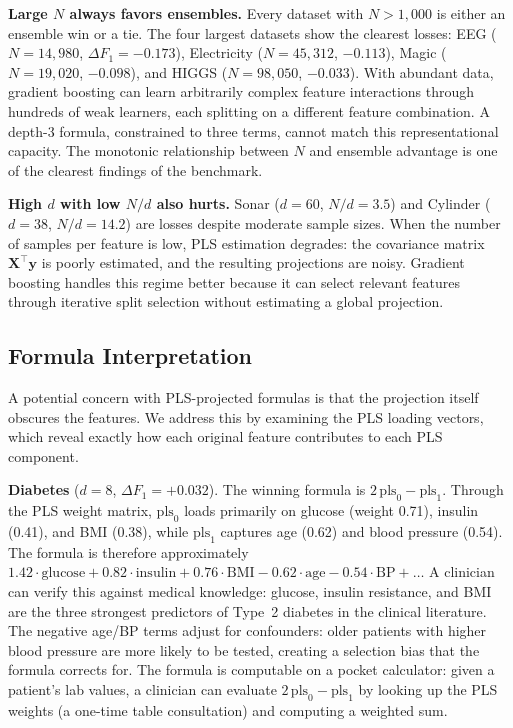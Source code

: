 \documentclass[journal]{IEEEtran}
\begin{document}
\textbf{Large $N$ always favors ensembles.}
Every dataset with $N > 1{,}000$ is either an ensemble win or a tie.
The four largest datasets show the clearest losses: EEG
($N = 14{,}980$, $\Delta F_1 = -0.173$), Electricity
($N = 45{,}312$, $-0.113$), Magic ($N = 19{,}020$, $-0.098$), and
HIGGS ($N = 98{,}050$, $-0.033$).  With abundant data, gradient
boosting can learn arbitrarily complex feature interactions through
hundreds of weak learners, each splitting on a different feature
combination.  A depth-3 formula, constrained to three terms, cannot
match this representational capacity.  The monotonic relationship
between $N$ and ensemble advantage is one of the clearest findings
of the benchmark.

\textbf{High $d$ with low $N/d$ also hurts.}
Sonar ($d = 60$, $N/d = 3.5$) and Cylinder ($d = 38$, $N/d = 14.2$)
are losses despite moderate sample sizes.  When the number of
samples per feature is low, PLS estimation degrades: the covariance
matrix $\mathbf{X}^\top \mathbf{y}$ is poorly estimated, and the
resulting projections are noisy.  Gradient boosting handles this
regime better because it can select relevant features through
iterative split selection without estimating a global projection.

\subsection{Formula Interpretation}
\label{sec:interpretation}

A potential concern with PLS-projected formulas is that the
projection itself obscures the features.  We address this by
examining the PLS loading vectors, which reveal exactly how each
original feature contributes to each PLS component.

\textbf{Diabetes} ($d = 8$, $\Delta F_1 = +0.032$).
The winning formula is $2\,\mathrm{pls}_0 - \mathrm{pls}_1$.
Through the PLS weight matrix, $\mathrm{pls}_0$ loads primarily
on glucose (weight 0.71), insulin (0.41), and BMI (0.38), while
$\mathrm{pls}_1$ captures age (0.62) and blood pressure (0.54).
The formula is therefore approximately
$1.42 \cdot \text{glucose} + 0.82 \cdot \text{insulin} + 0.76 \cdot
\text{BMI} - 0.62 \cdot \text{age} - 0.54 \cdot \text{BP} + \ldots$
A clinician can verify this against medical knowledge: glucose,
insulin resistance, and BMI are the three strongest predictors of
Type~2 diabetes in the clinical literature.  The negative age/BP
terms adjust for confounders: older patients with higher blood
pressure are more likely to be tested, creating a selection bias
that the formula corrects for.  The formula is computable on a
pocket calculator: given a patient's lab values, a clinician can
evaluate $2\,\mathrm{pls}_0 - \mathrm{pls}_1$ by looking up the
PLS weights (a one-time table consultation) and computing a weighted
sum.
\end{document}
